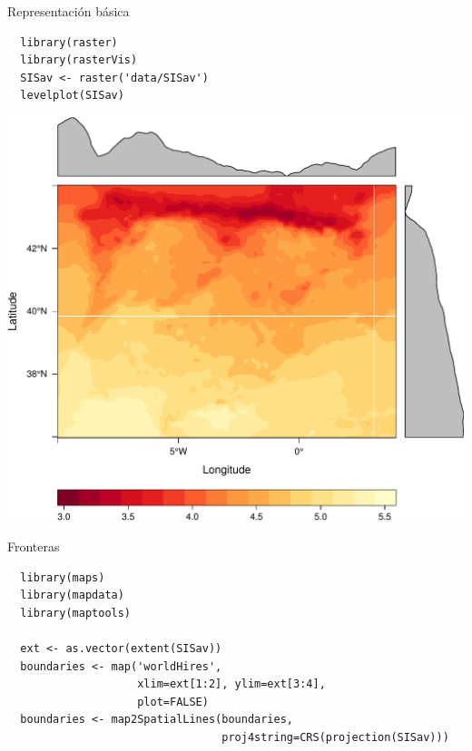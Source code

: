 \documentclass[xcolor={usenames,svgnames,dvipsnames}]{beamer}
\begin{document}
\begin{frame}[fragile,label=sec-2-2-1]{Representación básica}
 \lstset{language=R,label= ,caption= ,numbers=none}
\begin{lstlisting}
  library(raster)
  library(rasterVis)
  SISav <- raster('data/SISav')
  levelplot(SISav)
\end{lstlisting}
\end{frame}

\begin{frame}[label=sec-2-2-2]{}
\includegraphics[width=.9\linewidth]{figs/leveplotSISavOrig.pdf}
\end{frame}

\begin{frame}[fragile,label=sec-2-2-3]{Fronteras}
 \lstset{language=R,label= ,caption= ,numbers=none}
\begin{lstlisting}
  library(maps)
  library(mapdata)
  library(maptools)
  
  ext <- as.vector(extent(SISav))
  boundaries <- map('worldHires',
                    xlim=ext[1:2], ylim=ext[3:4],
                    plot=FALSE)
  boundaries <- map2SpatialLines(boundaries,
                                 proj4string=CRS(projection(SISav)))
\end{lstlisting}
\end{frame}
\end{document}
